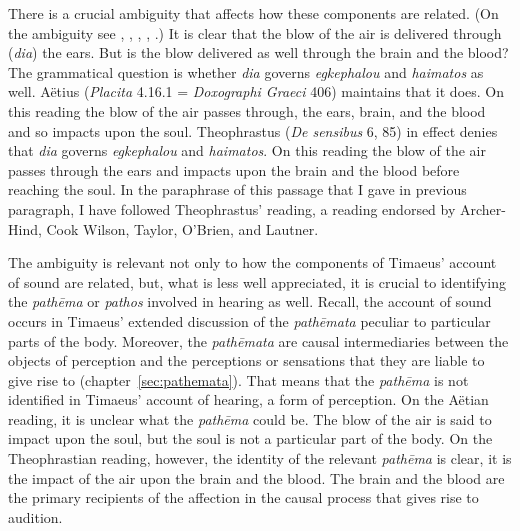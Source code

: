 There is a crucial ambiguity that affects how these components are related. (On the ambiguity see \citealt[246 n7]{Archer-Hind:1888qd}, \citealt[99--100]{Cook-Wilson:1889cs}, \citealt[476--7]{Taylor:1928qb}, \citealt[142 n38]{OBrien:1984ji}, \citealt[235, n1]{Lautner:2005aa}.) It is clear that the blow of the air is delivered through (\emph{dia}) the ears. But is the blow delivered as well through the brain and the blood? The grammatical question is whether \emph{dia} governs \emph{egkephalou} and \emph{haimatos} as well. Aëtius (\emph{Placita} 4.16.1 = \emph{Doxographi Graeci} 406) maintains that it does. On this reading the blow of the air passes through, the ears, brain, and the blood and so impacts upon the soul. Theophrastus (\emph{De sensibus} 6, 85) in effect denies that \emph{dia} governs \emph{egkephalou} and \emph{haimatos}. On this reading the blow of the air passes through the ears and impacts upon the brain and the blood before reaching the soul. In the paraphrase of this passage that I gave in previous paragraph, I have followed Theophrastus' reading, a reading endorsed by Archer-Hind, Cook Wilson, Taylor, O'Brien, and Lautner. 

The ambiguity is relevant not only to how the components of Timaeus' account of sound are related, but, what is less well appreciated, it is crucial to identifying the \emph{pathēma} or \emph{pathos} involved in hearing as well. Recall, the account of sound occurs in Timaeus' extended discussion of the \emph{pathēmata} peculiar to particular parts of the body. Moreover, the \emph{pathēmata} are causal intermediaries between the objects of perception and the perceptions or sensations that they are liable to give rise to (chapter~\ref{sec:pathemata}). That means that the \emph{pathēma} is not identified in Timaeus' account of hearing, a form of perception. On the Aëtian reading, it is unclear what the \emph{pathēma} could be. The blow of the air is said to impact upon the soul, but the soul is not a particular part of the body. On the Theophrastian reading, however, the identity of the relevant \emph{pathēma} is clear, it is the impact of the air upon the brain and the blood. The brain and the blood are the primary recipients of the affection in the causal process that gives rise to audition.

